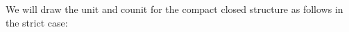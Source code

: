 We will draw the unit and counit for the compact closed structure as follows in the strict case:
%
%
